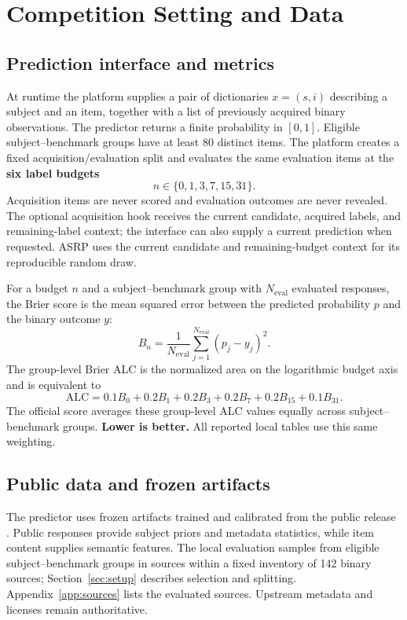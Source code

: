 \documentclass{article}
\newcommand{\alc}{\mathrm{ALC}}
\begin{document}


\section{Competition Setting and Data}\label{sec:setting}

\subsection{Prediction interface and metrics}

At runtime the platform supplies a pair of dictionaries $x=(s,i)$ describing a subject and an item, together with a list of previously acquired binary observations. The predictor returns a finite probability in $[0,1]$. Eligible subject--benchmark groups have at least 80 distinct items. The platform creates a fixed acquisition/evaluation split and evaluates the same evaluation items at the \textbf{six label budgets}
\[
  n \in \{0,1,3,7,15,31\}.
\]
Acquisition items are never scored and evaluation outcomes are never revealed. The optional acquisition hook receives the current candidate, acquired labels, and remaining-label context; the interface can also supply a current prediction when requested. ASRP uses the current candidate and remaining-budget context for its reproducible random draw.

For a budget $n$ and a subject--benchmark group with $N_{\mathrm{eval}}$ evaluated responses, the Brier score is the mean squared error between the predicted probability $p$ and the binary outcome $y$:
\[
  B_n = \frac{1}{N_{\mathrm{eval}}}\sum_{j=1}^{N_{\mathrm{eval}}}(p_j-y_j)^2.
\]
The group-level Brier ALC is the normalized area on the logarithmic budget axis and is equivalent to
\[
  \alc = 0.1B_0+0.2B_1+0.2B_3+0.2B_7+0.2B_{15}+0.1B_{31}.
\]
The official score averages these group-level ALC values equally across subject--benchmark groups. \textbf{Lower is better.} All reported local tables use this same weighting.

\subsection{Public data and frozen artifacts}

The predictor uses frozen artifacts trained and calibrated from the public  release \citep{measurementdb}. Public responses provide subject priors and metadata statistics, while item content supplies semantic features. The local evaluation samples from \EligibleGroups{} eligible subject--benchmark groups in \EligibleSources{} sources within a fixed inventory of 142 binary sources; Section~\ref{sec:setup} describes selection and splitting. Appendix~\ref{app:sources} lists the evaluated sources. Upstream metadata and licenses remain authoritative.
\end{document}
